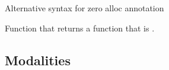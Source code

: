 \label{Oxcaml--val-alt_syntax}\begin{ocamlindent}Alternative syntax for zero alloc annotation\end{ocamlindent}%
\medbreak
\label{Oxcaml--val-curried_zero_alloc}\begin{ocamlindent}Function that returns a function that is .\end{ocamlindent}%
\medbreak
\subsection{Modalities\label{Oxcaml--modalities}}%
\label{Oxcaml--type-opaque}\\
